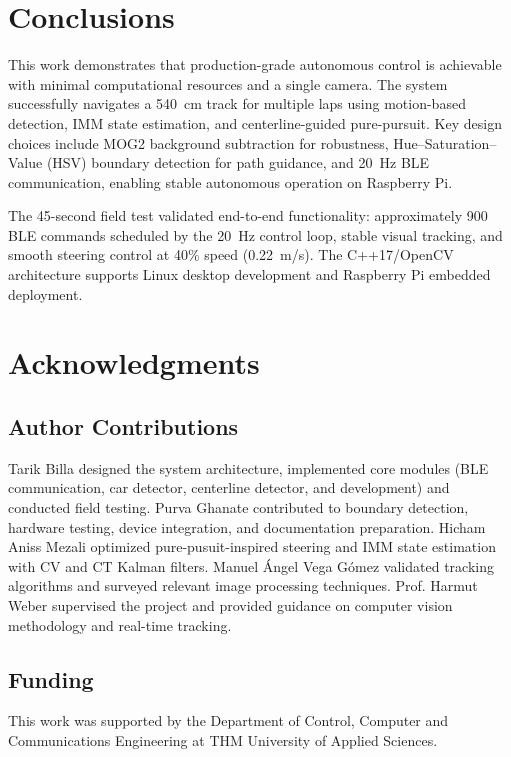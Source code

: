 \documentclass[twocolumn]{article}
\begin{document}
\section{Conclusions}

This work demonstrates that production-grade autonomous control is achievable with minimal computational resources and a single camera. The system successfully navigates a 540~cm track for multiple laps using motion-based detection, IMM state estimation, and centerline-guided pure-pursuit. Key design choices include MOG2 background subtraction for robustness, Hue--Saturation--Value (HSV) boundary detection for path guidance, and 20~Hz BLE communication, enabling stable autonomous operation on Raspberry Pi.

The 45-second field test validated end-to-end functionality: approximately 900 BLE commands scheduled by the 20~Hz control loop, stable visual tracking, and smooth steering control at 40\% speed (0.22~m/s). The C++17/OpenCV architecture supports Linux desktop development and Raspberry Pi embedded deployment.



\section*{Acknowledgments}

\subsection*{Author Contributions}
Tarik Billa designed the system architecture, implemented core modules (BLE communication, car detector, centerline detector, and development) and conducted field testing. Purva Ghanate contributed to boundary detection, hardware testing, device integration, and documentation preparation. Hicham Aniss Mezali optimized pure-pusuit-inspired steering and IMM  state estimation with CV and CT Kalman filters. Manuel Ángel Vega Gómez validated tracking algorithms and surveyed relevant image processing techniques. Prof. Harmut Weber supervised the project and provided guidance on computer vision methodology and real-time tracking.

\subsection*{Funding}
This work was supported by the Department of Control, Computer and Communications Engineering at THM University of Applied Sciences.
\end{document}
